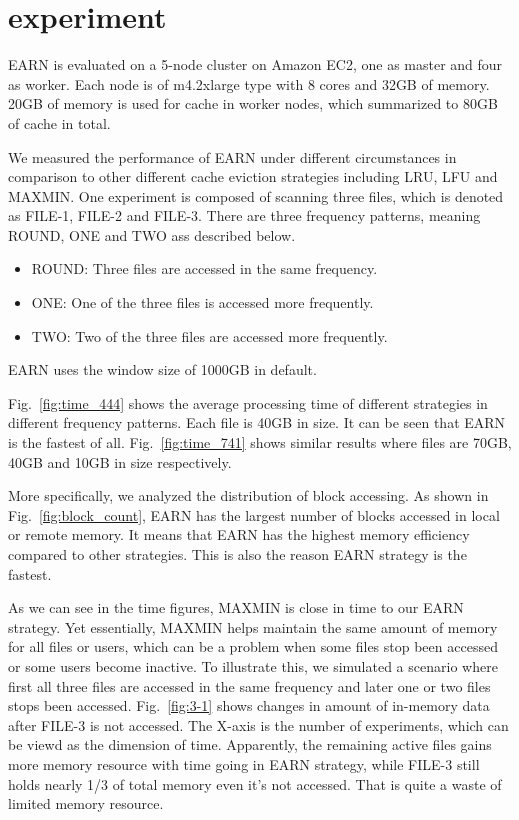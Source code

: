 \documentclass[10pt,conference,letterpaper]{IEEEtran}
\begin{document}
\section{experiment}

EARN is evaluated on a 5-node cluster on Amazon EC2, one as master and four as worker. Each node is of m4.2xlarge type with 8 cores and 32GB of memory. 20GB of memory is used for cache in worker nodes, which summarized to 80GB of cache in total.

We measured the performance of EARN under different circumstances in comparison to other different cache eviction strategies including LRU, LFU and MAXMIN.
One experiment is composed of scanning three files, which is denoted as FILE-1, FILE-2 and FILE-3.
There are three frequency patterns, meaning ROUND, ONE and TWO ass described below.
\begin{itemize}
\item ROUND: Three files are accessed in the same frequency.
\item ONE: One of the three files is accessed more frequently.
\item TWO: Two of the three files are accessed more frequently.
\end{itemize}
EARN uses the window size of 1000GB in default.

Fig.~\ref{fig:time_444} shows the average processing time of different strategies in different frequency patterns. Each file is 40GB in size. It can be seen that EARN is the fastest of all.
Fig.~\ref{fig:time_741} shows similar results where files are 70GB, 40GB and 10GB in size respectively.

More specifically, we analyzed the distribution of block accessing. As shown in Fig.~\ref{fig:block_count}, EARN has the largest number of blocks accessed in local or remote memory. It means that EARN has the highest memory efficiency compared to other strategies. This is also the reason EARN strategy is the fastest.

As we can see in the time figures, MAXMIN is close in time to our EARN strategy. Yet essentially, MAXMIN helps maintain the same amount of memory for all files or users, which can be a problem when some files stop been accessed or some users become inactive.
To illustrate this, we simulated a scenario where first all three files are accessed in the same frequency and later one or two files stops been accessed.
Fig.~\ref{fig:3-1} shows changes in amount of in-memory data after FILE-3 is not accessed. The X-axis is the number of experiments, which can be viewd as the dimension of time. 
Apparently, the remaining active files gains more memory resource with time going in EARN strategy, while FILE-3 still holds nearly 1/3 of total memory even it's not accessed. That is quite a waste of limited memory resource.
\end{document}
